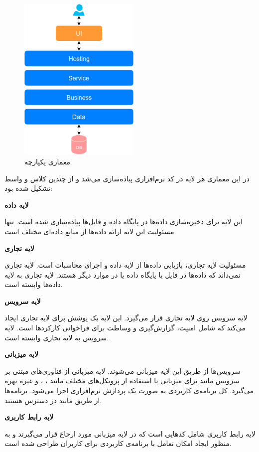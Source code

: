 \begin{figure}[!h]
	\centering
	\includegraphics[height=8cm]{images/monolithic-architecture}
	\caption{معماری یکپارچه}
	\label{monolithic}
\end{figure}

در این معماری هر لایه در کد نرم‌افزاری پیاده‌سازی می‌شد و از چندین کلاس و واسط تشکیل شده بود:

\textbf{لایه داده}

این لایه برای ذخیره‌سازی داده‌ها در پایگاه داده و فایل‌ها پیاده‌سازی شده است. تنها مسئولیت این لایه ارائه داده‌ها از منابع داده‌ای مختلف است.

\textbf{لایه تجاری}

مسئولیت لایه تجاری، بازیابی داده‌ها از لایه داده و اجرای محاسبات است. لایه تجاری نمی‌داند که داده‌ها در فایل یا پایگاه داده یا در موارد دیگر هستند. لایه تجاری به لایه داده‌ها وابسته است.

\textbf{لایه سرویس}

لایه سرویس روی لایه تجاری قرار می‌گیرد. این لایه یک پوشش برای لایه تجاری ایجاد می‌کند که شامل امنیت، گزارش‌گیری و وساطت برای فراخوانی کارکردها است. لایه سرویس به لایه تجاری وابسته است.

\textbf{لایه میزبانی}

سرویس‌ها از طریق این لایه میزبانی می‌شوند. لایه میزبانی از فناوری‌های مبتنی بر سرویس مانند  برای میزبانی با استفاده از پروتکل‌های مختلف مانند  ، ، و غیره بهره می‌گیرد. کل برنامه‌ی کاربردی به صورت یک پردازش نرم‌افزاری اجرا می‌شود. برنامه‌‌ها از طریق  مانند  در دسترس هستند.

\textbf{لایه رابط کاربری}

لایه رابط کاربری شامل کدهایی است که در لایه میزبانی مورد ارجاع قرار می‌گیرند و به منظور ایجاد امکان تعامل با برنامه‌ی کاربردی برای کاربران طراحی شده است.

